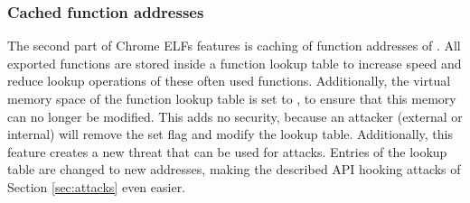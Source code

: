 \subsubsection{Cached function addresses}
The second part of Chrome ELFs features is caching of function addresses of . All exported functions are stored inside a function lookup table to increase speed and reduce lookup operations of these often used functions. Additionally, the virtual memory space of the function lookup table is set to , to ensure that this memory can no longer be modified. This adds no security, because an attacker (external or internal) will remove the set  flag and modify the lookup table. Additionally, this feature creates a new threat that can be used for attacks. Entries of the lookup table are changed to new addresses, making the described API hooking attacks of Section \ref{sec:attacks} even easier.